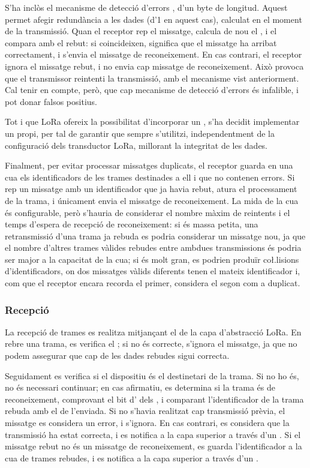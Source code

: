 \documentclass{tfgitic}[2024/07/01]
\begin{document}
S'ha inclòs el mecanisme de detecció d'errors , d'un byte de longitud. Aquest permet afegir redundància a les dades (d'\SI{1}{\byte} en aquest cas), calculat en el moment de la transmissió. Quan el receptor rep el missatge, calcula de nou el , i el compara amb el rebut: si coincideixen, significa que el missatge ha arribat correctament, i s'envia el missatge de reconeixement. En cas contrari, el receptor ignora el missatge rebut, i no envia cap missatge de reconeixement. Això provoca que el transmissor reintenti la transmissió, amb el mecanisme vist anteriorment. Cal tenir en compte, però, que cap mecanisme de detecció d'errors és infalible, i pot donar falsos positius.  

Tot i que LoRa ofereix la possibilitat d'incorporar un , s'ha decidit implementar un  propi, per tal de garantir que sempre s'utilitzi, independentment de la configuració dels transductor LoRa, millorant la integritat de les dades. 

Finalment, per evitar processar missatges duplicats, el receptor guarda en una cua els identificadors de les trames destinades a ell i que no contenen errors. Si rep un missatge amb un identificador que ja havia rebut, atura el processament de la trama, i únicament envia el missatge de reconeixement. La mida de la cua és configurable, però s'hauria de considerar el nombre màxim de reintents i el temps d'espera de recepció de reconeixement: si és massa petita, una retransmissió d'una trama ja rebuda es podria considerar un missatge nou, ja que el nombre d'altres trames vàlides rebudes entre ambdues transmissions és podria ser major a la capacitat de la cua; si és molt gran, es podrien produïr co\l.lisions d'identificadors, on dos missatges vàlids diferents tenen el mateix identificador i, com que el receptor encara recorda el primer, considera el segon com a duplicat. 
\subsubsection{Recepció}
La recepció de trames es realitza mitjançant el  de la capa d'abstracció LoRa. En rebre una trama, es verifica el ; si no és correcte, s'ignora el missatge, ja que no podem assegurar que cap de les dades rebudes sigui correcta.

Seguidament es verifica si el dispositiu és el destinetari de la trama. Si no ho és, no és necessari continuar; en cas afirmatiu, es determina si la trama és de reconeixement, comprovant el bit d' dels , i comparant l'identificador de la trama rebuda amb el de l'enviada. Si no s'havia realitzat cap transmissió prèvia, el missatge es considera un error, i s'ignora. En cas contrari, es considera que la transmissió ha estat correcta, i es notifica a la capa superior a través d'un . Si el missatge rebut no és un missatge de reconeixement, es guarda l'identificador a la cua de trames rebudes, i es notifica a la capa superior a través d'un .
\end{document}
